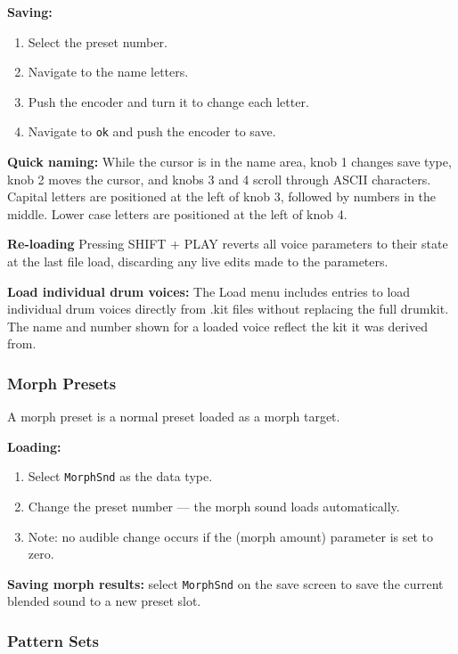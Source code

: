 \textbf{Saving:}

\begin{enumerate}
\def\labelenumi{\arabic{enumi}.}
\tightlist
\item
  Select the preset number.
\item
  Navigate to the name letters.
\item
  Push the encoder and turn it to change each letter.
\item
  Navigate to \texttt{ok} and push the encoder to save.
\end{enumerate}

\textbf{Quick naming:} While the cursor is in the name area, knob 1
changes save type, knob 2 moves the cursor, and knobs 3 and 4 scroll
through ASCII characters. Capital letters are positioned at the left of
knob 3, followed by numbers in the middle. Lower case letters are
positioned at the left of knob 4.

\textbf{Re-loading} Pressing SHIFT + PLAY reverts all voice parameters
to their state at the last file load, discarding any live edits made to
the parameters.

\textbf{Load individual drum voices:} The Load menu includes entries to
load individual drum voices directly from .kit files without replacing
the full drumkit. The name and number shown for a loaded voice reflect
the kit it was derived from.

\subsubsection{Morph Presets}\label{morph-presets}

A morph preset is a normal preset loaded as a morph target.

\textbf{Loading:}

\begin{enumerate}
\def\labelenumi{\arabic{enumi}.}
\tightlist
\item
  Select \texttt{MorphSnd} as the data type.
\item
  Change the preset number --- the morph sound loads automatically.
\item
  Note: no audible change occurs if the  (morph amount)
  parameter is set to zero.
\end{enumerate}

\textbf{Saving morph results:} select \texttt{MorphSnd} on the save
screen to save the current blended sound to a new preset slot.

\subsubsection{Pattern Sets}\label{pattern-sets}

